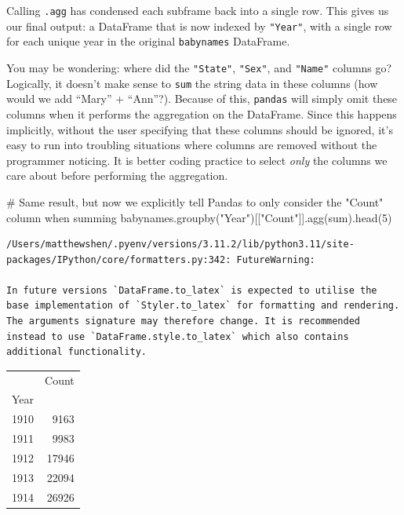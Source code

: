 \documentclass[
  letterpaper,
  DIV=11,
  numbers=noendperiod]{scrreprt}
\newenvironment{Shaded}{\begin{snugshade}}{\end{snugshade}}
\newcommand{\BuiltInTok}[1]{\textcolor[rgb]{0.00,0.23,0.31}{#1}}
\newcommand{\CommentTok}[1]{\textcolor[rgb]{0.37,0.37,0.37}{#1}}
\newcommand{\DecValTok}[1]{\textcolor[rgb]{0.68,0.00,0.00}{#1}}
\newcommand{\NormalTok}[1]{\textcolor[rgb]{0.00,0.23,0.31}{#1}}
\newcommand{\StringTok}[1]{\textcolor[rgb]{0.13,0.47,0.30}{#1}}
\begin{document}
Calling \texttt{.agg} has condensed each subframe back into a single
row. This gives us our final output: a DataFrame that is now indexed by
\texttt{"Year"}, with a single row for each unique year in the original
\texttt{babynames} DataFrame.

You may be wondering: where did the \texttt{"State"}, \texttt{"Sex"},
and \texttt{"Name"} columns go? Logically, it doesn't make sense to
\texttt{sum} the string data in these columns (how would we add ``Mary''
+ ``Ann''?). Because of this, \texttt{pandas} will simply omit these
columns when it performs the aggregation on the DataFrame. Since this
happens implicitly, without the user specifying that these columns
should be ignored, it's easy to run into troubling situations where
columns are removed without the programmer noticing. It is better coding
practice to select \emph{only} the columns we care about before
performing the aggregation.

\begin{Shaded}
\begin{Highlighting}[]
\CommentTok{\# Same result, but now we explicitly tell Pandas to only consider the "Count" column when summing}
\NormalTok{babynames.groupby(}\StringTok{"Year"}\NormalTok{)[[}\StringTok{"Count"}\NormalTok{]].agg(}\BuiltInTok{sum}\NormalTok{).head(}\DecValTok{5}\NormalTok{)}
\end{Highlighting}
\end{Shaded}

\begin{verbatim}
/Users/matthewshen/.pyenv/versions/3.11.2/lib/python3.11/site-packages/IPython/core/formatters.py:342: FutureWarning:

In future versions `DataFrame.to_latex` is expected to utilise the base implementation of `Styler.to_latex` for formatting and rendering. The arguments signature may therefore change. It is recommended instead to use `DataFrame.style.to_latex` which also contains additional functionality.
\end{verbatim}

\begin{tabular}{lr}
\toprule
{} &  Count \\
Year &        \\
\midrule
1910 &   9163 \\
1911 &   9983 \\
1912 &  17946 \\
1913 &  22094 \\
1914 &  26926 \\
\bottomrule
\end{tabular}
\end{document}
